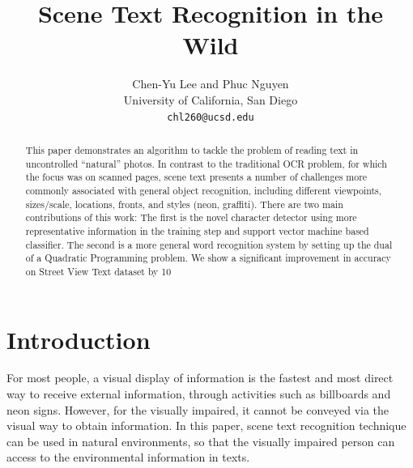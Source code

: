 \documentclass[10pt,twocolumn,letterpaper]{article}
\begin{document}
\title{Scene Text Recognition in the Wild}

\author{Chen-Yu Lee and Phuc Nguyen\\
University of California, San Diego\\
{\tt\small chl260@ucsd.edu}
}

\maketitle
\thispagestyle{empty}

\begin{abstract}
This paper demonstrates an algorithm to tackle the problem of reading text in uncontrolled ``natural'' photos. In contrast to the traditional OCR problem, for which the focus was on scanned pages, scene text presents a number of challenges more commonly associated with general object recognition, including different viewpoints, sizes/scale, locations, fronts, and styles (neon, graffiti). There are two main contributions of this work: The first is the novel character detector using more representative information in the training step and support vector machine based classifier. The second is a more general word recognition system by setting up the dual of a Quadratic Programming problem. We show a significant improvement in accuracy on Street View Text dataset by 10%
\end{abstract}

\section{Introduction}

For most people, a visual display of information is the fastest and most direct way to receive external information, through activities such as billboards and neon signs. However, for the visually impaired, it cannot be conveyed via the visual way to obtain information. In this paper, scene text recognition technique can be used in natural environments, so that the visually impaired person can access to the environmental information in texts.
\end{document}
